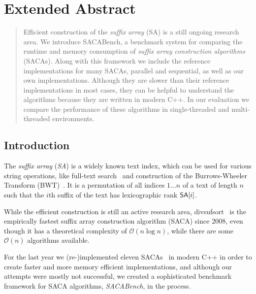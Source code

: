 \chapter{Extended Abstract}


{
\newtheorem*{abstract}{Abstract}

\begin{abstract}
    Efficient construction of the \emph{suffix array} (SA) is a still ongoing research area.
    We introduce SACABench, a benchmark system for comparing the runtime
    and memory consumption of \emph{suffix array construction algorithms} (SACAs).
    Along with this framework we include the reference implementations for many SACAs,
    parallel and sequential, as well as our own implementations.
    Although they are slower than their reference implementations in most cases,
    they can be helpful to understand the algorithms because they are written in modern C++.
    In our evaluation we compare the performance of these algorithms
    in single-threaded and multi-threaded environments.
\end{abstract}
}

\section{Introduction}

The  \emph{suffix array} (\emph{SA}) is a widely known text index,
which can be used for various string operations,
like full-text search~\cite{makinen} and construction of the Burrows-Wheeler Transform (BWT)~\cite{BWT}.
It is a permutation of all indices $1 \dots n$ of a text of length $n$ such
that the $i$th suffix of the text has lexicographic rank $\sa[i]$.

While the efficient construction is still an active research area,
divsufsort~\cite{saca:5,saca:5:repo} is the empirically fastest
suffix array construction algorithm (SACA) since 2008,
even though it has a theoretical complexity of $\mathcal O (n \log n)$,
while there are some $\mathcal O(n)$ algorithms available.

For the last year we (re-)implemented eleven SACAs~\cite{saca:3,saca:11,saca:5,saca:9,saca:1,saca:8,saca:4,saca:7,saca:10,saca:6,saca:2}
in modern C++ in order to create faster and more memory efficient implementations,
and although our attempts were mostly not successful,
we created a sophisticated benchmark framework for SACA algorithms, \emph{SACABench}, in the process.

